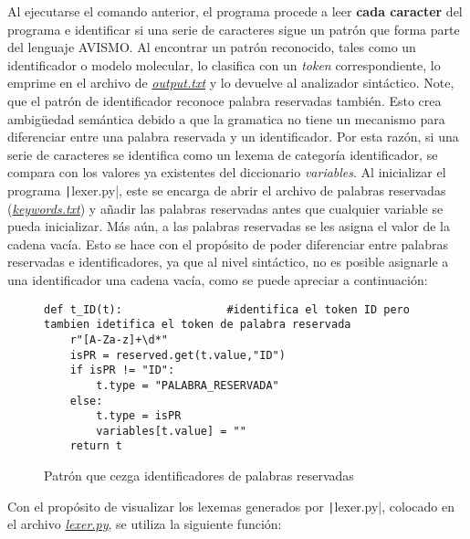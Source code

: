 Al ejecutarse el comando anterior, el programa procede a leer \textbf{cada caracter} del programa e identificar si una serie de caracteres sigue un patrón que forma parte del lenguaje AVISMO. Al encontrar un patrón reconocido, tales como un identificador o modelo molecular, lo clasifica con un \textit{token} correspondiente, lo emprime en el archivo de \href{https://github.com/aramis-matos/comp4999_compilers_project/blob/master/code/python_remake/output.txt}{\textit{output.txt}} y lo devuelve al analizador sintáctico. Note, que el patrón de identificador reconoce palabra reservadas también. Esto crea ambigüedad semántica debido a que la gramatica no tiene un mecanismo para diferenciar entre una palabra reservada y un identificador. Por esta razón, si una serie de caracteres se identifica como un lexema de categoría identificador, se compara con los valores ya existentes del diccionario \textit{variables}. Al inicializar el programa \texttt|lexer.py|, este se encarga de abrir el archivo de
palabras reservadas (\href{https://github.com/aramis-matos/comp4999_compilers_project/blob/master/code/python remake/keywords.txt}{\textit{keywords.txt}}) y añadir las palabras reservadas antes que cualquier variable se pueda inicializar. Más aún, a las palabras reservadas se les asigna el valor de la cadena vacía. Esto se hace con el propósito de poder diferenciar entre palabras reservadas e identificadores, ya que al nivel sintáctico, no es posible asignarle a una identificador una cadena vacía, como se puede apreciar a continuación:
\begin{figure}[H]
\begin{verbatim}
def t_ID(t):                #identifica el token ID pero tambien idetifica el token de palabra reservada
    r"[A-Za-z]+\d*"
    isPR = reserved.get(t.value,"ID") 
    if isPR != "ID":
        t.type = "PALABRA_RESERVADA"
    else:
        t.type = isPR
        variables[t.value] = ""
    return t
\end{verbatim}
\caption{Patrón que cezga identificadores de palabras reservadas}
\label{fig: id}
\end{figure}
Con el propósito de visualizar los lexemas generados por \texttt|lexer.py|, colocado en el archivo \href{https://github.com/aramis-matos/comp4999_compilers_project/blob/master/code/python_remake/lexer.py}{\textit{lexer.py}}, se utiliza la siguiente función:
